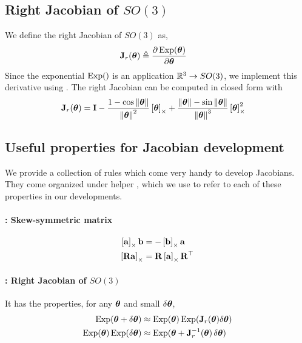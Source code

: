 \subsection{Right Jacobian of $SO(3)$ }

We define the right Jacobian of $SO(3)$ as, 
%
\begin{align}\label{equ:Jr}
\bfJ_r(\bth) &\te \dpar{\Exp(\bth)}{\bth} 
\end{align}
%
Since the exponential $\Exp()$ is an application $\bbR^3\to SO(3)$,
we implement this derivative using .
The right Jacobian 
can be computed in closed form with
%
\begin{align}
\bfJ_r(\bth) &= \bfI - \frac{1-\cos\nth}{\nth^2}\hatx{\bth} + \frac{\nth-\sin\nth}{\nth^3}\hatx{\bth}^2 
\end{align}






\subsection{Useful properties for Jacobian development}
\label{sec:DosDonts}

We provide a collection of rules which come very handy to develop Jacobians. They come organized under helper \!\!\!\!, which we use to refer to each of these properties in our developments.


\paragraph{\ccross : Skew-symmetric matrix}
%
\begin{align}
\hatx{\bfa}\bfb &= -\hatx{\bfb}\bfa 
\\
\hatx{\bfR\bfa} &= \bfR\hatx{\bfa}\bfR\tr 
\end{align}

\paragraph{\cJr : Right Jacobian of $SO(3)$ }

It has the properties, for any $\bth$ and small $\dth$,
%
\begin{align}
\Exp(\bth+\dth) &\approx \Exp(\bth)\Exp(\bfJ_r(\bth)\dth) \\
\Exp(\bth)\Exp(\dth) &\approx \Exp(\bth+\bfJ_r\inv(\bth)\,\dth) 
\end{align}
%






